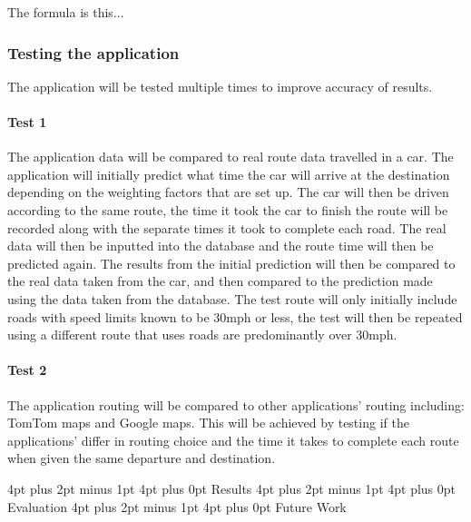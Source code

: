 \documentclass[12pt,a4paper]{article}
\makeatletter
\renewcommand\section{\@startsection {section}{1}{0mm} %
                               {4pt plus 2pt minus 1pt} %
                               {4pt plus 0pt} %
                               {\bfseries}}
\makeatother
\begin{document}
The formula is this...

\subsubsection{Testing the application}
The application will be tested multiple times to improve accuracy of results. 

\paragraph{Test 1}
The application data will be compared to real route data travelled in a car. The application will initially predict what time the car will arrive at the destination depending on the weighting factors that are set up. The car will then be driven according to the same route, the time it took the car to finish the route will be recorded along with the separate times it took to complete each road. The real data will then be inputted into the database and the route time will then be predicted again. The results from the initial prediction will then be compared to the real data taken from the car, and then compared to the prediction made using the data taken from the database. The test route will only initially include roads with speed limits known to be 30mph or less, the test will then be repeated using a different route that uses roads are predominantly over 30mph.

\paragraph{Test 2}
The application routing will be compared to other applications' routing including: TomTom maps and Google maps. This will be achieved by testing if the applications' differ in routing choice and the time it takes to complete each route when given the same departure and destination. 

\section{Results}
\section{Evaluation}
\section{Future Work}
\end{document}
